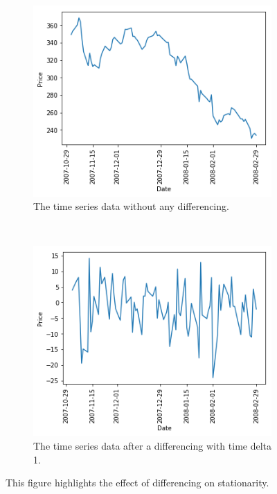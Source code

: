 \documentclass[12pt]{article}
\begin{document}
\begin{figure}[t!]
	\centering
	\begin{subfigure}[t]{0.5\textwidth}
		\centering
		\includegraphics[width=\linewidth]{diff1.png}
		\caption{The time series data without any differencing.}
	\end{subfigure}%
	~ 
	\begin{subfigure}[t]{0.5\textwidth}
		\centering
		\includegraphics[width=\linewidth]{diff2.png}
		\caption{The time series data after a differencing with time delta 1.}
	\end{subfigure}
	\caption{This figure highlights the effect of differencing on stationarity.}
	\label{differencing2}
\end{figure}
\end{document}
